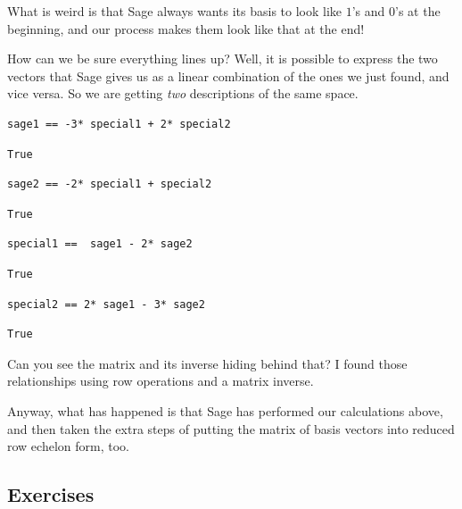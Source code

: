 \documentclass[10pt,]{book}
\theoremstyle{plain}
\theoremstyle{definition}
\numberwithin{equation}{section}
\begin{document}
      What is weird is that Sage always wants its basis to look
      like \(1\)'s and \(0\)'s at the beginning, and our process makes
      them look like that at the end!
\par

      How can we be sure everything lines up?  Well, it is possible to
      express the two vectors that Sage gives us as a linear combination
      of the ones we just found, and vice versa. So we are getting \emph{two}
      descriptions of the same space.
\begin{lstlisting}[style=sageinput]
sage1 == -3* special1 + 2* special2
\end{lstlisting}
\begin{lstlisting}[style=sageoutput]
True
\end{lstlisting}
\begin{lstlisting}[style=sageinput]
sage2 == -2* special1 + special2
\end{lstlisting}
\begin{lstlisting}[style=sageoutput]
True
\end{lstlisting}
\begin{lstlisting}[style=sageinput]
special1 ==  sage1 - 2* sage2
\end{lstlisting}
\begin{lstlisting}[style=sageoutput]
True
\end{lstlisting}
\begin{lstlisting}[style=sageinput]
special2 == 2* sage1 - 3* sage2
\end{lstlisting}
\begin{lstlisting}[style=sageoutput]
True
\end{lstlisting}
\par

      Can you see the matrix and its inverse hiding behind that? I found those
      relationships using row operations and a matrix inverse.
\par

      Anyway, what has happened is that Sage has performed our calculations above,
      and then taken the extra steps of putting the matrix of basis vectors into
      reduced row echelon form, too.
\typeout{************************************************}
\typeout{************************************************}
\subsection[Exercises]{Exercises}\label{subsection-67}
\end{document}
